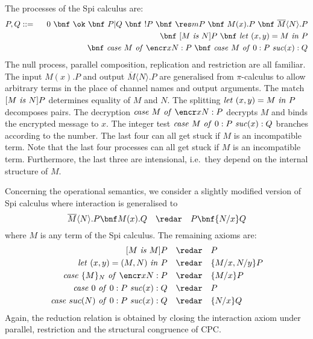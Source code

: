 \documentclass{LMCS}
\renewcommand{\rew}{\redar}
\begin{document}
The processes of the Spi calculus are:
\begin{eqnarray*}
P,Q &::=& \ \ 0\ \bnf \ \ok \ \bnf\ P|Q\ \bnf\  !P\ \bnf\  \res m P\ \bnf\  M(x).P\
\bnf\  \overline{M}\langle N\rangle .P\\
& &                 \ \bnf\ [M\ {\it is}\ N]P
										\ \bnf\ {\it let}\ (x,y)=M\ {\it in}\ P\\
& &                 \ \bnf\ {\it case}\ M\ {\it of}\ \encr x N:P
                    \ \bnf\ {\it case}\ M\ {\it of}\ 0:P\ {\it suc}(x):Q
\end{eqnarray*}
The null process, parallel composition, replication and restriction
are all familiar.
The input $M(x).P$ and output $\overline{M}\langle N\rangle .P$ are generalised 
from $\pi$-calculus to 
allow arbitrary terms in the place of channel names and output arguments.
The match $[M\ {\it is}\ N]P$ determines equality of $M$ and $N$.
The splitting ${\it let}\ (x,y)=M\ {\it in}\ P$ decomposes pairs.
The decryption ${\it case}\ M\ {\it of}\ \encr x N:P$ decrypts $M$ 
and binds the encrypted message to $x$.
The integer test ${\it case}\ M\ {\it of}\ 0:P\ {\it suc}(x):Q$ branches
according to the number.
{The last four can all get stuck if $M$ is an incompatible term.}
{Note that the last four processes can all get stuck if $M$ is an incompatible term.
Furthermore, the last three are intensional, i.e.\ they depend on the internal
structure of $M$.}

Concerning the operational semantics, we
consider a slightly modified version of Spi calculus where
interaction is generalised to
$$
\overline{M}\langle N\rangle .P\bnf M(x) .Q \quad\rew\quad P\bnf \{N/x\}Q
$$
where $M$ is any term of the Spi calculus. The remaining axioms are:
$$
\begin{array}{rcl}
[M\ {\it is}\ M]P &\redar& P
\vspace*{.1cm}
\\
{\it let}\ (x,y)=(M,N)\ {\it in}\ P &\redar& \{M/x,N/y\}P
\vspace*{.1cm}
\\
{\it case}\ \{M\}_N\ {\it of}\ \encr x N:P &\redar& \{M/x\}P
\vspace*{.1cm}
\\
{\it case}\ 0\ {\it of}\ 0:P\ {\it suc}(x):Q &\redar& P
\vspace*{.1cm}
\\
{\it case}\ suc(N)\ {\it of}\ 0:P\ {\it suc}(x):Q &\redar& \{N/x\}Q
\end{array}
$$
Again, the reduction relation is obtained by closing the interaction axiom
under parallel, restriction and the structural congruence of CPC. 
\end{document}
